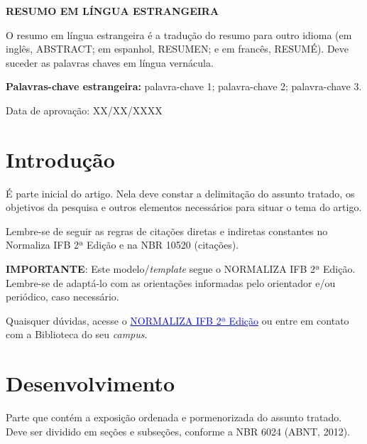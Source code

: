 \documentclass[a4paper, 12pt, twoside]{article}
\newcommand{\aprovacao}{Data de aprovação: XX/XX/XXXX}
\begin{document}
\begin{center}

    \par \textbf{\MakeUppercase{RESUMO EM LÍNGUA ESTRANGEIRA}}
    
\end{center}

\noindent [OPCIONAL] O resumo em língua estrangeira é a tradução do resumo para outro idioma (em inglês, ABSTRACT; em espanhol, RESUMEN; e em francês, RESUMÉ). Deve suceder as palavras chaves em língua vernácula. \medskip

\noindent \textbf{Palavras-chave estrangeira:} palavra-chave 1; palavra-chave 2; palavra-chave 3. \bigskip

\noindent \aprovacao \bigskip %


\section{Introdução}

\par [OBRIGATÓRIO] É parte inicial do artigo. Nela deve constar a delimitação do assunto tratado, os objetivos da pesquisa e outros elementos necessários para situar o tema do artigo.

\par Lembre-se de seguir as regras de citações diretas e indiretas constantes no Normaliza IFB 2ª Edição e na NBR 10520 (citações).

\par \textbf{IMPORTANTE}: Este modelo/\textit{template} segue o NORMALIZA IFB 2ª Edição. Lembre-se de adaptá-lo com as orientações informadas pelo orientador e/ou periódico, caso necessário.

\par Quaisquer dúvidas, acesse o \textcolor{blue}{\underline{NORMALIZA IFB 2ª Edição}} ou entre em contato com a Biblioteca do seu \textit{campus}.


\section{Desenvolvimento}

\par [OBRIGATÓRIO] Parte que contém a exposição ordenada e pormenorizada do assunto tratado. Deve ser dividido em seções e subseções, conforme a NBR 6024 (ABNT, 2012).
\end{document}
